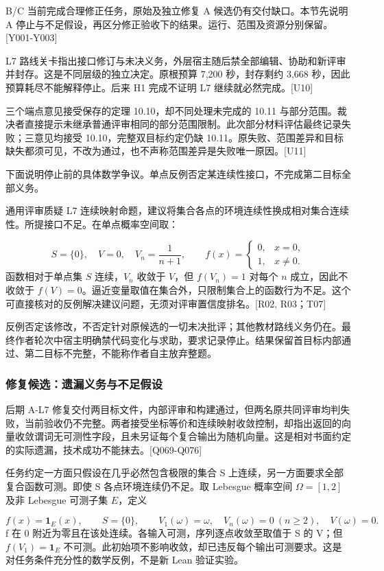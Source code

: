 B/C 当前完成合理修正任务，原始及独立修复 A 候选仍有交付缺口。本节先说明 A 停止与不足假设，再区分修正验收下的结果。运行、范围及资源分别保留。[Y001-Y003]

L7 路线关卡指出接口修订与未决义务，外层宿主随后禁全部编辑、协助和新评审并封存。这是不同层级的独立决定。原根预算 7,200 秒，封存剩约 3,668 秒，因此预算耗尽不能解释停止。后来 H1 完成不证明 L7 继续就必然完成。[U10]

三个端点意见接受保存的定理 10.10，却不同处理未完成的 10.11 与部分范围。裁决者直接提示未继承普通评审相同的部分范围限制。此次部分材料评估最终记录失败；三意见均接受 10.10，完整双目标约定仍缺 10.11。原失败、范围差异和目标缺失都须可见，不改为通过，也不声称范围差异是失败唯一原因。[U11]

下面说明停止前的具体数学争议。单点反例否定某连续性接口，不完成第二目标全部义务。

通用评审质疑 L7 连续映射命题，建议将集合各点的环境连续性换成相对集合连续性。所提接口不足。在单点概率空间取：

\[
S=\{0\},\quad V=0,\quad V_n=\frac1{n+1},\qquad
f(x)=\begin{cases}0,&x=0,\\1,&x\ne0.\end{cases}
\]
函数相对于单点集 $S$ 连续，$V_n$ 收敛于 $V$，但 $f(V_n)=1$ 对每个 $n$ 成立，因此不收敛于 $f(V)=0$。逼近变量取值在集合外，只限制集合上的函数行为不足。这个可直接核对的反例解决建议问题，无须对评审置信度排名。[R02, R03；T07]

反例否定该修改，不否定针对原候选的一切未决批评；其他教材路线义务仍在。最终作者轮次中宿主明确禁代码变化与求助，要求记录停止。结果保留首目标内部通过、第二目标不完整，不能称作者自主放弃整题。

\subsubsection[修复候选：遗漏义务与不足假设]{\texorpdfstring{\protect\hypertarget{g16-1}{}修复候选：遗漏义务与不足假设}{修复候选：遗漏义务与不足假设}}
后期 A-L7 修复交付两目标文件，内部评审和构建通过，但两名原共同评审均判失败，当前验收仍不完整。两者接受坐标等价和连续映射收敛控制，却指出返回的向量收敛谓词无可测性字段，且未另证每个复合输出为随机向量。这是相对书面约定的实际遗漏，技术成功不能抹去。[Q069-Q076]

任务约定一方面只假设在几乎必然包含极限的集合 S 上连续，另一方面要求全部复合函数可测。即使 S 各点环境连续仍不足。取 Lebesgue 概率空间 $\Omega=[1,2]$ 及非 Lebesgue 可测子集 $E$，定义

\[
f(x)=\mathbf{1}_E(x),\qquad S=\{0\},\qquad
V_1(\omega)=\omega,\quad V_n(\omega)=0\ (n\ge2),\quad V(\omega)=0.
\]
f 在 0 附近为零且在该处连续。各输入可测，序列逐点收敛至取值于 S 的 V；但 $f(V_1)=\mathbf{1}_E$ 不可测。此初始项不影响收敛，却已违反每个输出可测要求。这是对任务条件充分性的数学反例，不是新 Lean 验证实验。

